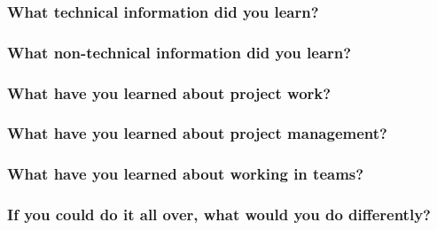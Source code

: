 \subsubsection{What technical information did you learn?}

\subsubsection{What non-technical information did you learn?}

\subsubsection{What have you learned about project work?}

\subsubsection{What have you learned about project management?}

\subsubsection{What have you learned about working in teams?}

\subsubsection{If you could do it all over, what would you do differently?}
